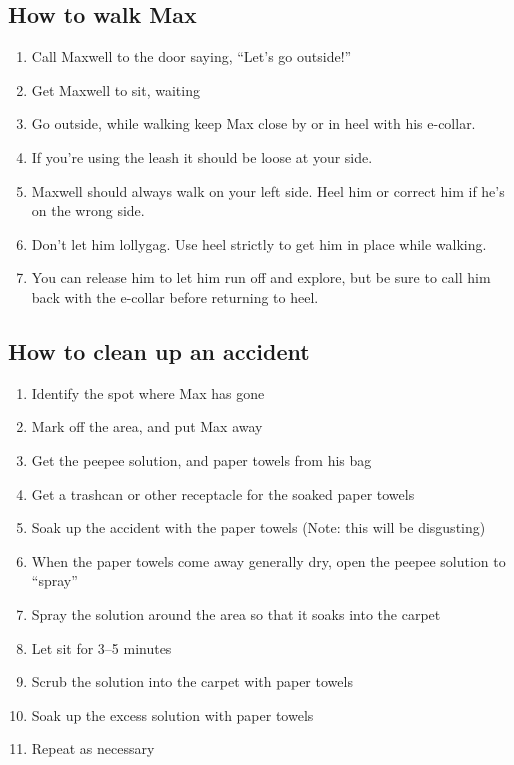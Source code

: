 \documentclass[pdftex,12pt]{article}
\begin{document}
\subsection{How to walk Max}
\begin{enumerate}\label{itm:how_to_walk}
    \item Call Maxwell to the door saying, ``Let's go outside!''
    \item Get Maxwell to sit, waiting
    \item Go outside, while walking keep Max close by or in heel with his e-collar.
    \item If you're using the leash it should be loose at your side.
    \item Maxwell should always walk on your left side.
        Heel him or correct him if he's on the wrong side.
    \item Don't let him lollygag.
        Use heel strictly to get him in place while walking.
    \item You can release him to let him run off and explore, but
        be sure to call him back with the e-collar before returning to heel.
\end{enumerate}

\subsection{How to clean up an accident}
\begin{enumerate}\label{itm:how_to_clean_accident}
    \item Identify the spot where Max has gone
    \item Mark off the area, and put Max away
    \item Get the peepee solution, and paper towels from his bag
    \item Get a trashcan or other receptacle for the soaked paper towels
    \item Soak up the accident with the paper towels (Note: this will be disgusting)
    \item When the paper towels come away generally dry, open the peepee solution to ``spray''
    \item Spray the solution around the area so that it soaks into the carpet
    \item Let sit for 3--5 minutes
    \item Scrub the solution into the carpet with paper towels
    \item Soak up the excess solution with paper towels
    \item Repeat as necessary
\end{enumerate}
\end{document}
